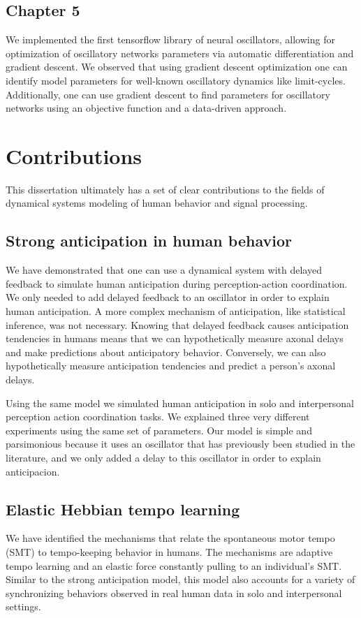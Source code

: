 \documentclass{report}
\begin{document}
\subsection{Chapter 5}
We implemented the first tensorflow library of neural oscillators, allowing for optimization of oscillatory networks parameters via automatic differentiation and gradient descent. We observed that using gradient descent optimization one can identify model parameters for well-known oscillatory dynamics like limit-cycles. Additionally, one can use gradient descent to find parameters for oscillatory networks using an objective function and a data-driven approach.

\section{Contributions}
This dissertation ultimately has a set of clear contributions to the fields of dynamical systems modeling of human behavior and signal processing. 

\subsection{Strong anticipation in human behavior}
We have demonstrated that one can use a dynamical system with delayed feedback to simulate human anticipation during perception-action coordination. We only needed to add delayed feedback to an oscillator in order to explain human anticipation. A more complex mechanism of anticipation, like statistical inference, was not necessary. Knowing that delayed feedback causes anticipation tendencies in humans means that we can hypothetically measure axonal delays and make predictions about anticipatory behavior. Conversely, we can also hypothetically measure anticipation tendencies and predict a person's axonal delays. 

Using the same model we simulated human anticipation in solo and interpersonal perception action coordination tasks. We explained three very different experiments using the same set of parameters. Our model is simple and parsimonious because it uses an oscillator that has previously been studied in the literature, and we only added a delay to this oscillator in order to explain anticipacion. 

\subsection{Elastic Hebbian tempo learning}
We have identified the mechanisms that relate the spontaneous motor tempo (SMT) to tempo-keeping behavior in humans. The mechanisms are adaptive tempo learning and an elastic force constantly pulling to an individual's SMT. Similar to the strong anticipation model, this model also accounts for a variety of synchronizing behaviors observed in real human data in solo and interpersonal settings.
\end{document}

